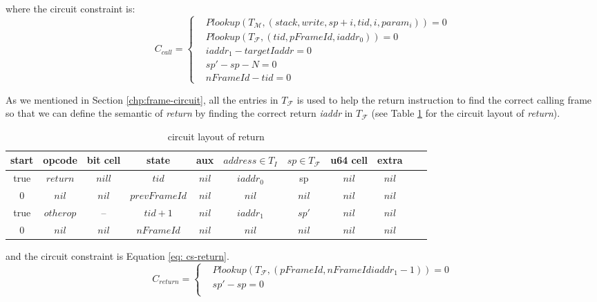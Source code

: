 \noindent where the circuit constraint is:
\[
    C_{call} = \begin{cases}
        &Plookup(T_\mathcal{M}, (stack, write, sp+i, tid, i, param_i)) = 0 \\
        &Plookup(T_\mathcal{F}, (tid, pFrameId, iaddr_0)) = 0 \\
        &iaddr_1 - targetIaddr = 0\\
        &sp' - sp - N = 0 \\
        &nFrameId - tid = 0
    \end{cases}
\]

 As we mentioned in Section \ref{chp:frame-circuit}, all the entries in $T_\mathcal{F}$ is used to help the return instruction to find the correct calling frame so that we can define the semantic of \emph{return} by finding the correct return \emph{iaddr} in $T_\mathcal{F}$ (see Table \ref{tbl:return-instruction} for the circuit layout of \emph{return}).
\begin{table}[!h]
\begin{center}
\begin{tabular}{ | c | c | c | c | c | c | c | c | c | c | c | }
  \hline
  start & opcode & bit cell & state & aux & $address \in T_{I}$ & $sp \in T_\mathcal{F}$& u64 cell & extra \\ 
  \hline
   true & $return$ & $nill$ & $tid$ & $nil$ & $iaddr_0$ & sp & $nil$ & $nil$\\ 
 \hline
   0 & $nil$ & $nil$ & $prevFrameId$ & $nil$ & $nil$ & $nil$ & $nil$ & $nil$\\ 
 \hline
   true & $otherop$ & -- & $tid + 1$ & $nil$ & $iaddr_1$ & $sp'$ & $nil$ & $nil$\\
 \hline
   0 & $nil$ & $nil$ & $nFrameId$ & $nil$ & $nil$ & $nil$ & $nil$ & $nil$\\ 
 \hline
\end{tabular}
\caption{circuit layout of return}
\label{tbl:return-instruction}
\end{center}
\end{table}
and the circuit constraint is Equation \ref{eq: cs-return}.
\begin{equation}
    C_{return} =  \begin{cases}
        &Plookup(T_\mathcal{F}, (pFrameId, nFrameId iaddr_1 - 1)) = 0 \\
        &sp' - sp = 0 \\
    \end{cases}
\label{eq: cs-return}
\end{equation}

